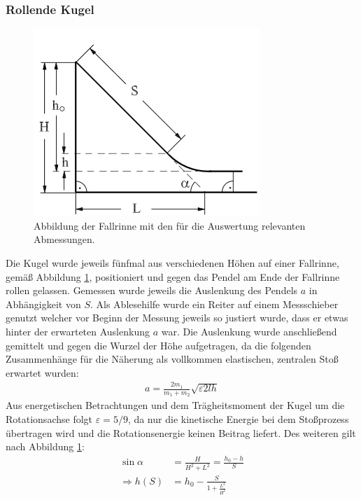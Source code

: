 \subsubsection*{Rollende Kugel}

\begin{figure}[h]
	\centering
	\includegraphics[width=0.7\linewidth]{res/FallrinneSkizze}
	\caption{Abbildung der Fallrinne mit den für die Auswertung relevanten Abmessungen\cite{anleitung-ws2017}.}
	\label{fig:rinneskizze}
\end{figure}

Die Kugel wurde jeweils fünfmal aus verschiedenen Höhen auf einer Fallrinne, gemäß Abbildung \ref{fig:rinneskizze}, positioniert und gegen das Pendel am Ende der Fallrinne rollen gelassen. Gemessen wurde jeweils die Auslenkung des Pendels $a$ in Abhängigkeit von $S$. Als Ablesehilfe wurde ein Reiter auf einem Messschieber genutzt welcher vor Beginn der Messung jeweils so justiert wurde, dass er etwas hinter der erwarteten Auslenkung $a$ war.
Die Auslenkung wurde anschließend gemittelt und gegen die Wurzel der Höhe aufgetragen, da die folgenden Zusammenhänge für die Näherung als vollkommen elastischen, zentralen Stoß erwartet wurden:
\begin{align}
a=\frac{2m_1}{m_1+m_2}\sqrt{\varepsilon 2 l h}
\end{align}
Aus energetischen Betrachtungen und dem Trägheitsmoment der Kugel um die Rotationsachse folgt $\varepsilon= 5/9$, da nur die kinetische Energie  bei dem Stoßprozess übertragen wird und die Rotationsenergie keinen Beitrag liefert.
Des weiteren gilt nach Abbildung \ref{fig:rinneskizze}:
\begin{align}
\sin \alpha &=\frac{H}{H^2+L^2}=\frac{h_0-h}{S} \\
\Rightarrow  h(S) &= h_0-\frac{S}{1+\frac{L^2}{H^2}}
\end{align}













